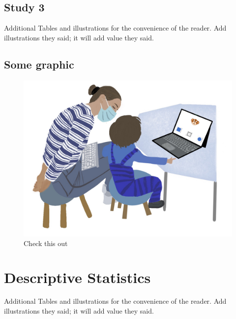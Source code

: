 \documentclass[
  man]{apa6}
\begin{document}
\subsection{Study 3}\label{study-3-1}

Additional Tables and illustrations for the convenience of the reader. Add illustrations they said; it will add value they said.

\subsection{Some graphic}\label{some-graphic-2}

\begin{figure}

{\centering \includegraphics{../illustrations/Symlit_Rep_Setup_fromarrows} 

}

\caption{Check this out}\label{fig:suppl-setup5}
\end{figure}

\section{Descriptive Statistics}\label{descriptive-statistics}

Additional Tables and illustrations for the convenience of the reader. Add illustrations they said; it will add value they said.
\end{document}
